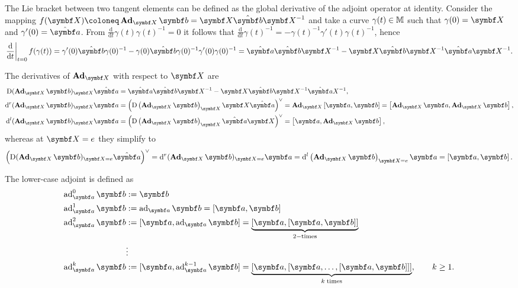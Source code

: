 The Lie bracket between two tangent elements can be defined as the global derivative of the adjoint operator at identity. Consider the mapping $f(\X) \coloneq \bAd_\X \b = \X \hat \b \X^{-1}$ and take a curve $\gamma(t) \in \mathbb{M}$ such that $\gamma(0) = \X$ and $\gamma'(0) = \hat \a$. From $\frac{\mathrm{d}}{\mathrm{d}t} \gamma(t) \gamma(t)^{-1} = 0$ it follows that $\frac{\mathrm{d}}{\mathrm{d}t} \gamma(t)^{-1} = - \gamma(t)^{-1} \gamma'(t) \gamma(t)^{-1}$, hence
\begin{equation}
  \left. \frac{\mathrm{d}}{\mathrm{d}t} \right|_{t=0} f(\gamma(t))  = \gamma'(0) \hat \b \gamma(0)^{-1} - \gamma(0) \hat \b \gamma(0)^{-1} \gamma'(0) \gamma(0)^{-1} = \hat \a \hat \b \X^{-1} - \X \hat \b \X^{-1} \hat \a \X^{-1} .
\end{equation}
\begin{properties}
  The derivatives of $\bAd_\X$ with respect to $\X$ are
  \begin{subequations}
    \begin{align}
      \label{eq:bAd_D}
      \mathrm{D} (\bAd_\X \b)_\X \hat \a & = \hat \a \hat \b \X^{-1} - \X \hat \b \X^{-1} \hat \a X^{-1},                                                                                   \\
      \label{eq:bAd_dr}
      \mathrm{d}^r (\bAd_\X \b)_\X \a    & = \left( \mathrm{D} \left(\bAd_\X \b \right)_\X \X \hat \a \right)^\vee = \bAd_\X \left[ \a, \b \right] = \left[ \bAd_\X \a, \bAd_\X \b \right], \\
      \label{eq:bAd_dl}
      \mathrm{d}^l (\bAd_\X \b)_\X \a    & = \left( \mathrm{D} \left(\bAd_\X \b \right)_\X \hat \a \X \right)^\vee = \left[ \a, \bAd_\X \b \right],
    \end{align}
  \end{subequations}
  whereas at $\X = \id$ they simplify to
  \begin{equation}
    \left( \mathrm{D} (\bAd_\X \b)_{\X = \id} \hat \a \right)^\vee = \mathrm{d}^r (\bAd_\X \b)_{\X = \id} \a= \mathrm{d}^l \left(\bAd_\X \b \right)_{\X = \id}  \a = \left[ \a, \b \right].
  \end{equation}
\end{properties}
The lower-case adjoint is defined as
\begin{equation}
  \label{eq:lowercase_adjoint}
  \begin{aligned}
    \ad_\a^0 \b & : = \b                                                                                                           \\
    \ad_\a^1 \b & : = \ad_\a \b = [\a,\b]                                                                                          \\
    \ad_\a^2 \b & : = [\a,  \ad_\a \b] = \underbrace{[\a,[\a,\b]]}_{2-\mathrm{times}}                                              \\
                & \vdots                                                                                                           \\
    \ad_\a^k \b & := [\a, \ad_\a^{k - 1} \b] = \underbrace{[\a, [ \a , \ldots, [\a,\b]]]}_{k \; \mathrm{times}} , \qquad k \geq 1.
  \end{aligned}
\end{equation}
